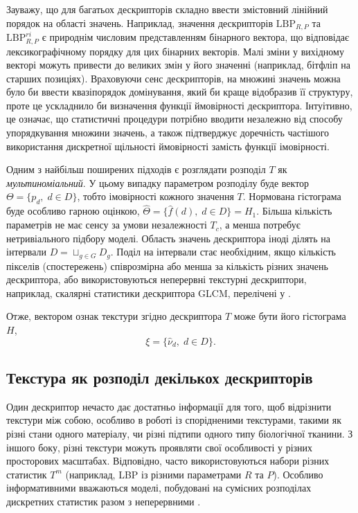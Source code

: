 Зауважу, що для багатьох дескрипторів складно ввести змістовний лінійний порядок на області значень. 
Наприклад, значення дескрипторів $\mathrm{LBP}_{R,P}$ та $\mathrm{LBP}^{ri}_{R,P}$ є природнім числовим представленням бінарного вектора, що відповідає лексикографічному порядку для цих бінарних векторів.
Малі зміни у вихідному векторі можуть привести до великих змін у його значенні (наприклад, бітфліп на старших позиціях).
Враховуючи сенс дескрипторів, на множині значень можна було би ввести квазіпорядок домінування, який би краще відобразив її структуру, проте це ускладнило би визначення функції ймовірності дескриптора.
Інтуітивно, це означає, що статистичні процедури потрібно вводити незалежно від способу упорядкування множини значень, 
а також підтверджує доречність частішого використання дискретної щільності ймовірності замість функції імовірності.

Одним з найбільш поширених підходів є розглядати розподіл $T$ як \textit{мультиноміальний}. 
У цьому випадку параметром розподілу буде вектор $\Theta = \{p_d, \; d\in D\}$, тобто імовірності кожного значення $T$.
Нормована гістограма буде особливо гарною оцінкою, $\hat \Theta = \{\hat f(d), \; d\in D\} = H_1$.
Більша кількість параметрів не має сенсу за умови незалежності $T_c$, а менша потребує нетривіального підбору моделі.
Область значень дескриптора іноді ділять на інтервали $D = \sqcup_{g\in G} D_g$.
Поділ на інтервали стає необхідним, якщо кількість пікселів (спостережень) співрозмірна або менша за кількість різних значень дескриптора, 
або використовуються неперервні текстурні дескриптори, наприклад, скалярні статистики дескриптора GLCM, перелічені у \cite{belsare2015}.

Отже, вектором ознак текстури згідно дескриптора $T$ може бути його гістограма $H$,
\begin{equation*}
    \xi = \{\hat\nu_d, \; d\in D\}.
\end{equation*}

\subsection{Текстура як розподіл декількох дескрипторів}\label{section1.2b}\hfill

Один дескриптор нечасто дає достатньо інформації для того, щоб відрізнити текстури між собою, особливо в роботі із спорідненими текстурами, 
такими як різні стани одного матеріалу, чи різні підтипи одного типу біологічної тканини.
З іншого боку, різні текстури можуть проявляти свої особливості у різних просторових масштабах.
Відповідно, часто використовуються набори різних статистик $T^m$ (наприклад, LBP із різними параметрами $R$ та $P$).
Особливо інформативними вважаються моделі, побудовані на сумісних розподілах дискретних статистик разом з неперервними \cite{guo2010lbpv}.

